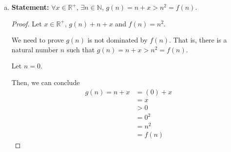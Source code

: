 \documentclass[12pt]{article}
\begin{document}
\begin{enumerate}[a.]
\begin{proof}
    \end{proof}

    \item

    \textbf{Statement:} $\forall x \in \mathbb{R}^{+}$, $\exists n \in \mathbb{N}$,
    $g(n) = n + x > n^2 = f(n)$.

    \begin{proof}
        Let $x \in \mathbb{R}^{+}$, $g(n) + n + x$ and $f(n) = n^2$.

        \bigskip

        We need to prove $g(n)$ is not dominated by $f(n)$. That is, there is a natural
        number $n$ such that $g(n) = n + x > n^2 = f(n)$.

        \bigskip

        Let $n = 0$.

        \bigskip

        Then, we can conclude
        \setcounter{equation}{0}
        \begin{align}
            g(n) = n + x &= (0) + x\\
            &= x\\
            &> 0\\
            &= 0^2\\
            &= n^2\\
            &= f(n)
        \end{align}
    \end{proof}

\end{enumerate}
\end{document}
